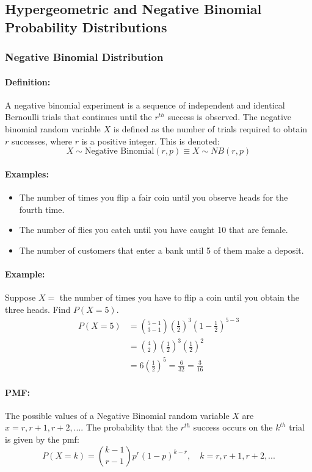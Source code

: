 \subsection{Hypergeometric and Negative Binomial Probability Distributions}
\hrulefill

\subsubsection*{Negative Binomial Distribution}
\paragraph*{Definition:}
A negative binomial experiment is a sequence of independent and identical Bernoulli trials that continues until the $r^{th}$ 
success is observed. The negative binomial random variable $X$ is defined as the number of trials required to obtain $r$ successes, 
where $r$ is a positive integer.
This is denoted:
\[
    X \sim \text{Negative Binomial}(r, p) \equiv X \sim NB(r, p)
\]

\paragraph*{Examples:} 
\begin{itemize}
    \item The number of times you flip a fair coin until you observe heads for the fourth time.
    \item The number of flies you catch until you have caught 10 that are female.
    \item The number of customers that enter a bank until 5 of them make a deposit.
\end{itemize}

\paragraph*{Example:}
Suppose $X=$ the number of times you have to flip a coin until you obtain the three heads. Find $P(X=5)$.
\begin{align*}
    P(X=5) &= \binom{5-1}{3-1} \left(\frac{1}{2}\right)^3 \left(1-\frac{1}{2}\right)^{5-3} \\
    &= \binom{4}{2} \left(\frac{1}{2}\right)^3 \left(\frac{1}{2}\right)^2 \\
    &= 6 \left(\frac{1}{2}\right)^5 = \frac{6}{32} = \frac{3}{16}
\end{align*}

\paragraph*{PMF:}
The possible values of a Negative Binomial random variable $X$ are $x = r, r+1, r+2, ...$.
The probability that the $r^{th}$ success occurs on the $k^{th}$ trial is given by the pmf:
\[
    P(X=k) = \binom{k-1}{r-1} p^r (1-p)^{k-r}, \quad k=r, r+1, r+2, ...
\]

